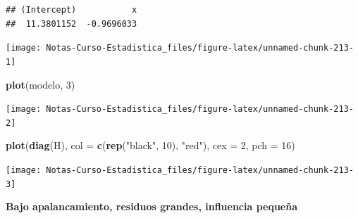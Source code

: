 \documentclass[
  12pt,
]{book}
\newenvironment{Shaded}{\begin{snugshade}}{\end{snugshade}}
\newcommand{\DataTypeTok}[1]{\textcolor[rgb]{0.13,0.29,0.53}{#1}}
\newcommand{\DecValTok}[1]{\textcolor[rgb]{0.00,0.00,0.81}{#1}}
\newcommand{\KeywordTok}[1]{\textcolor[rgb]{0.13,0.29,0.53}{\textbf{#1}}}
\newcommand{\NormalTok}[1]{#1}
\newcommand{\OperatorTok}[1]{\textcolor[rgb]{0.81,0.36,0.00}{\textbf{#1}}}
\newcommand{\StringTok}[1]{\textcolor[rgb]{0.31,0.60,0.02}{#1}}
\theoremstyle{definition}
\theoremstyle{definition}
\theoremstyle{definition}
\theoremstyle{remark}
\begin{document}
\begin{verbatim}
## (Intercept)           x 
##  11.3801152  -0.9696033
\end{verbatim}

\begin{Shaded}
\end{Shaded}

\begin{center}\texttt{[image: Notas-Curso-Estadistica\_files/figure-latex/unnamed-chunk-213-1]} \end{center}

\begin{Shaded}
\begin{Highlighting}[]
\KeywordTok{plot}\NormalTok{(modelo, }\DecValTok{3}\NormalTok{)}
\end{Highlighting}
\end{Shaded}

\begin{center}\texttt{[image: Notas-Curso-Estadistica\_files/figure-latex/unnamed-chunk-213-2]} \end{center}

\begin{Shaded}
\begin{Highlighting}[]
\KeywordTok{plot}\NormalTok{(}\KeywordTok{diag}\NormalTok{(H), }\DataTypeTok{col =} \KeywordTok{c}\NormalTok{(}\KeywordTok{rep}\NormalTok{(}\StringTok{"black"}\NormalTok{, }\DecValTok{10}\NormalTok{), }\StringTok{"red"}\NormalTok{), }\DataTypeTok{cex =} \DecValTok{2}\NormalTok{, }
    \DataTypeTok{pch =} \DecValTok{16}\NormalTok{)}
\end{Highlighting}
\end{Shaded}

\begin{center}\texttt{[image: Notas-Curso-Estadistica\_files/figure-latex/unnamed-chunk-213-3]} \end{center}

\textbf{Bajo apalancamiento, residuos grandes, influencia pequeña}
\end{document}

